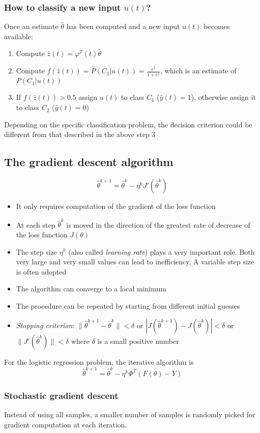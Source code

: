 \documentclass{book}
\theoremstyle{definition}
\theoremstyle{remark}
\theoremstyle{remark}
\begin{document}
\subsubsection{How to classify a new input $u(t)$?}
Once an estimate $\hat{\theta}$ has been computed and a new input $u(t)$ becomes available:
\begin{enumerate}
    \item Compute $\hat{z}(t)=\varphi^T(t)\hat{\theta}$ 
    \item Compute $f(\hat{z}(t))=\hat{P}(C_1|u(t)) = \displaystyle\frac{e^{\hat{z}}}{1+e^{\hat{z}}}$, which is an estimate of $P(C_1|u(t))$ 
    \item If $f(\hat{z}(t))>0.5$ assign $u(t)$ to class $C_1$ ($\hat{y}(t)=1$), otherwise assign it to class $C_2$ ($\hat{y}(t)=0$)
\end{enumerate}
Depending on the specific classification problem, the decision criterion could be different from that described in the above step 3
\subsection{The gradient descent algorithm}
\[
    \hat{\theta}^{k+1} = \hat{\theta}^k-\eta^kJ'(\hat{\theta}^k)
\]
\begin{itemize}
    \item It only requires computation of the gradient of the loss function 
    \item At each step $\hat{\theta}^k$ is moved in the direction of the greatest rate of decrease of the loss function $J(\theta)$ 
    \item The step size $\eta^k$ (also called \emph{learning rate}) plays a very important role. Both very large and very small values can lead to inefficiency. A variable step size is often adopted 
    \item The algorithm can converge to a local minimum 
    \item The procedure can be repeated by starting from different initial guesses  
    \item \emph{Stopping criterion}: $\|\hat{\theta}^{k+1}-\hat{\theta}^k\|<\delta$ or $|J(\hat{\theta}^{k+1})-J(\hat{\theta}^k)|<\delta$ or $\|J'(\hat{\theta}^k)\|<\delta$ where $\delta$ is a small positive number 
\end{itemize}
For the logistic regression problem, the iterative algorithm is 
\[
    \hat{\theta}^{k+1} = \hat{\theta}^k-\eta^k \Phi^T(F(\theta)-Y)
\]
\subsubsection{Stochastic gradient descent}
Instead of using all samples, a smaller number of samples is randomly picked for gradient computation at each iteration. 
\end{document}
